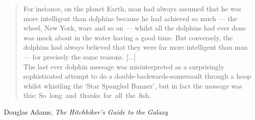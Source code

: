 \thispagestyle{empty}
\begin{flushright}

\vspace*{60mm}

\begin{quote}
For instance, on the planet Earth, man had always assumed that he was more intelligent than dolphins because he had achieved so much --- the wheel, New York, wars and so on --- whilst all the dolphins had ever done was muck about in the water having a good time. But conversely, the dolphins had always believed that they were far more intelligent than man --- for precisely the same reasons.
[...]\\
The last ever dolphin message was misinterpreted as a surprisingly sophisticated attempt to do a double-backwards-somersault through a hoop whilst whistling the `Star Spangled Banner', but in fact the message was this: \mbox{So long and thanks for all the fish.}
\end{quote}
\vspace{4mm}
Douglas Adams, \textit{The Hitchhiker's Guide to the Galaxy}

\end{flushright}
